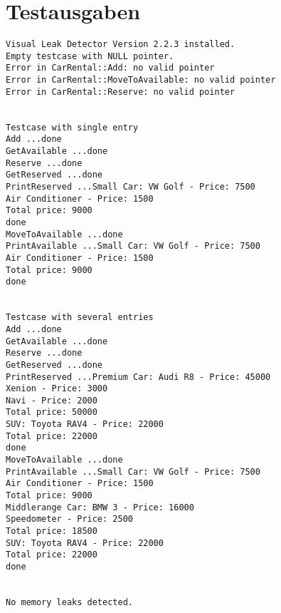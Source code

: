 \documentclass[12pt,a4paper]{article}
\begin{document}

\newpage

\newpage


\newpage

\section {Testausgaben} 

\begin {verbatim}
Visual Leak Detector Version 2.2.3 installed.
Empty testcase with NULL pointer.
Error in CarRental::Add: no valid pointer
Error in CarRental::MoveToAvailable: no valid pointer
Error in CarRental::Reserve: no valid pointer


Testcase with single entry
Add ...done
GetAvailable ...done
Reserve ...done
GetReserved ...done
PrintReserved ...Small Car: VW Golf - Price: 7500
Air Conditioner - Price: 1500
Total price: 9000
done
MoveToAvailable ...done
PrintAvailable ...Small Car: VW Golf - Price: 7500
Air Conditioner - Price: 1500
Total price: 9000
done


Testcase with several entries
Add ...done
GetAvailable ...done
Reserve ...done
GetReserved ...done
PrintReserved ...Premium Car: Audi R8 - Price: 45000
Xenion - Price: 3000
Navi - Price: 2000
Total price: 50000
SUV: Toyota RAV4 - Price: 22000
Total price: 22000
done
MoveToAvailable ...done
PrintAvailable ...Small Car: VW Golf - Price: 7500
Air Conditioner - Price: 1500
Total price: 9000
Middlerange Car: BMW 3 - Price: 16000
Speedometer - Price: 2500
Total price: 18500
SUV: Toyota RAV4 - Price: 22000
Total price: 22000
done


No memory leaks detected.
\end {verbatim}
\end{document}
